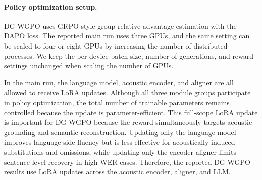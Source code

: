 \documentclass{article}
\begin{document}
\paragraph{Policy optimization setup.}
DG-WGPO uses GRPO-style group-relative advantage estimation with the DAPO loss.
The reported main run uses three GPUs, and the same setting can be scaled to four
or eight GPUs by increasing the number of distributed processes. We keep the
per-device batch size, number of generations, and reward settings unchanged when
scaling the number of GPUs.

In the main run, the language model, acoustic encoder, and aligner are all allowed
to receive LoRA updates. Although all three module groups participate in policy
optimization, the total number of trainable parameters remains controlled because
the update is parameter-efficient. This full-scope LoRA update is important for
DG-WGPO because the reward simultaneously targets acoustic grounding and semantic
reconstruction. Updating only the language model improves language-side fluency
but is less effective for acoustically induced substitutions and omissions, while
updating only the encoder-aligner limits sentence-level recovery in high-WER
cases. Therefore, the reported DG-WGPO results use LoRA updates across the
acoustic encoder, aligner, and LLM.
\end{document}
